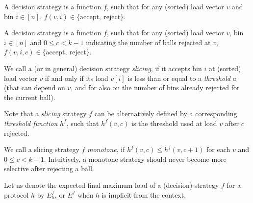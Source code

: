 \begin{definition} 
A \TwoThinning decision strategy is a function $f$, such that for any (sorted) load vector $v$ and bin $i\in[n]$, $f(v, i)\in\{\mathrm{accept},\ \mathrm{reject}\}$.
\end{definition}


\begin{definition} 
A \KThinning decision strategy is a function $f$, such that for any (sorted) load vector $v$, bin $i\in[n]$ and $0\leq c<k-1$ indicating the number of balls rejected at $v$, $f(v, i, c)\in\{\mathrm{accept},\ \mathrm{reject}\}$.
\end{definition}


\begin{definition} 
We call a \TwoThinning (or \KThinning in general) decision strategy \textit{slicing}, if it accepts bin $i$ at (sorted) load vector $v$ if and only if its load $v[i]$ is less than or equal to a \textit{threshold} $a$ (that can depend on $v$, and for \KThinning also on the number of bins already rejected for the current ball). 
\end{definition}


\begin{definition} 
Note that a \KThinning \textit{slicing} strategy $f$ can be alternatively defined by a corresponding \textit{threshold function} $h^f$, such that $h^f(v,c)$ is the threshold used at load $v$ after $c$  rejected.
\end{definition}



\begin{definition} 
We call a \KThinning slicing strategy $f$ \textit{monotone}, if $h^f(v,c)\leq h^f(v,c+1)$ for each $v$ and $0\leq c<k-1$. Intuitively, a monotone strategy should never become more selective after rejecting a ball.
\end{definition}


\begin{definition} 
Let us denote the expected final maximum load of a (decision) strategy $f$ for a protocol $h$ by $E^f_h$, or $E^f$ when $h$ is implicit from the context.
\end{definition}



